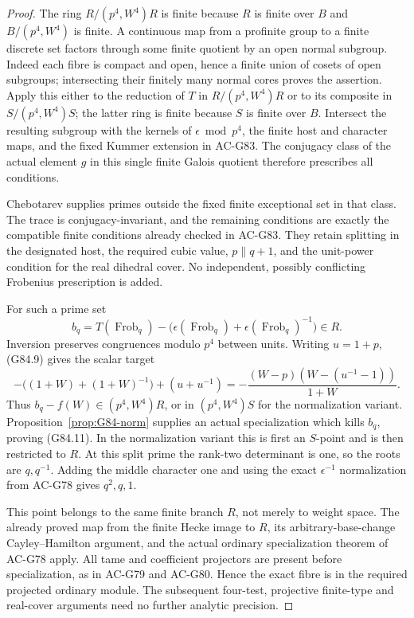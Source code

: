 \begin{proof}
The ring \(R/(p^4,W^4)R\) is finite because \(R\) is finite over
\(B\) and \(B/(p^4,W^4)\) is finite.
A continuous map from a profinite group to a finite discrete
set factors through some finite quotient by an open normal
subgroup. Indeed each fibre is compact and open, hence a finite
union of cosets of open subgroups; intersecting their finitely
many normal cores proves the assertion.
Apply this either to the reduction of \(T\) in \(R/(p^4,W^4)R\)
or to its composite in \(S/(p^4,W^4)S\); the latter ring is finite
because \(S\) is finite over \(B\). Intersect the resulting
subgroup with the kernels of \(\epsilon\bmod p^4\), the finite
host and character maps, and the fixed Kummer extension in AC-G83.
The conjugacy class of the actual element \(g\) in this single
finite Galois quotient therefore prescribes all conditions.

Chebotarev supplies primes outside the fixed finite exceptional
set in that class. The trace is conjugacy-invariant, and the
remaining conditions are exactly the compatible finite
conditions already checked in AC-G83. They retain splitting in
the designated host, the required cubic value,
\(p\parallel q+1\), and the unit-power condition for the real
dihedral cover. No independent, possibly conflicting Frobenius
prescription is added.

For such a prime set
\[
 b_q=T(\operatorname{Frob}_q)-
 \big(\epsilon(\operatorname{Frob}_q)
       +\epsilon(\operatorname{Frob}_q)^{-1}\big)\in R.
 \tag{G84.12}
\]
Inversion preserves congruences modulo \(p^4\) between units.
Writing \(u=1+p\), (G84.9) gives the scalar target
\[
 -\big((1+W)+(1+W)^{-1}\big)+(u+u^{-1})
   =-\frac{(W-p)(W-(u^{-1}-1))}{1+W}.
 \tag{G84.13}
\]
Thus \(b_q-f(W)\in(p^4,W^4)R\), or in
\((p^4,W^4)S\) for the normalization variant.
Proposition~\ref{prop:G84-norm} supplies an actual specialization
which kills \(b_q\), proving (G84.11). In the normalization
variant this is first an \(S\)-point and is then restricted to \(R\).
At this split prime the rank-two determinant is one, so the roots
are \(q,q^{-1}\). Adding the middle character one and using the
exact \(\epsilon^{-1}\) normalization from AC-G78 gives
\(q^2,q,1\).

This point belongs to the same finite branch \(R\), not merely to
weight space. The already proved map from the finite Hecke image
to \(R\), its arbitrary-base-change Cayley--Hamilton argument,
and the actual ordinary specialization theorem of AC-G78 apply.
All tame and coefficient projectors are present before
specialization, as in AC-G79 and AC-G80.
Hence the exact fibre is in the required projected ordinary
module. The subsequent four-test, projective finite-type and
real-cover arguments need no further analytic precision.
\end{proof}

